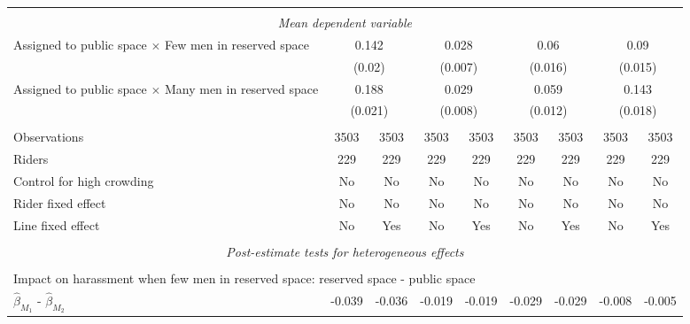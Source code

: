 \begin{tabular}{l*{8}{c}}
\\[-1.8ex] \hline \\[-1.8ex] \multicolumn{9}{c}{\textit{Mean dependent variable}} \\ Assigned to public space $\times$ Few men in reserved space& \multicolumn{2}{c}{0.142} & \multicolumn{2}{c}{0.028} & \multicolumn{2}{c}{0.06} & \multicolumn{2}{c}{0.09} \\  & \multicolumn{2}{c}{(0.02)} & \multicolumn{2}{c}{(0.007)} & \multicolumn{2}{c}{(0.016)} & \multicolumn{2}{c}{(0.015)} \\ Assigned to public space $\times$ Many men in reserved space & \multicolumn{2}{c}{0.188} & \multicolumn{2}{c}{0.029} & \multicolumn{2}{c}{0.059} & \multicolumn{2}{c}{0.143} \\  & \multicolumn{2}{c}{(0.021)} & \multicolumn{2}{c}{(0.008)} & \multicolumn{2}{c}{(0.012)} & \multicolumn{2}{c}{(0.018)} \\\\[-1ex] 
Observations        &        3503         &        3503         &        3503         &        3503         &        3503         &        3503         &        3503         &        3503         \\
Riders              &         229         &         229         &         229         &         229         &         229         &         229         &         229         &         229         \\
Control for high crowding&          No         &          No         &          No         &          No         &          No         &          No         &          No         &          No         \\
Rider fixed effect  &          No         &          No         &          No         &          No         &          No         &          No         &          No         &          No         \\
Line fixed effect   &          No         &         Yes         &          No         &         Yes         &          No         &         Yes         &          No         &         Yes         \\
\hline \\[-1ex]  \multicolumn{9}{c}{\textit{Post-estimate tests for heterogeneous effects}} \\\\[-1ex] \multicolumn{9}{l}{Impact on harassment when few men in reserved space: reserved space - public space} \\ \quad $\hat\beta_{M_1}$ - $\hat\beta_{M_2}$&      -0.039         &      -0.036         &      -0.019         &      -0.019         &      -0.029         &      -0.029         &      -0.008         &      -0.005         \\

\end{tabular}
